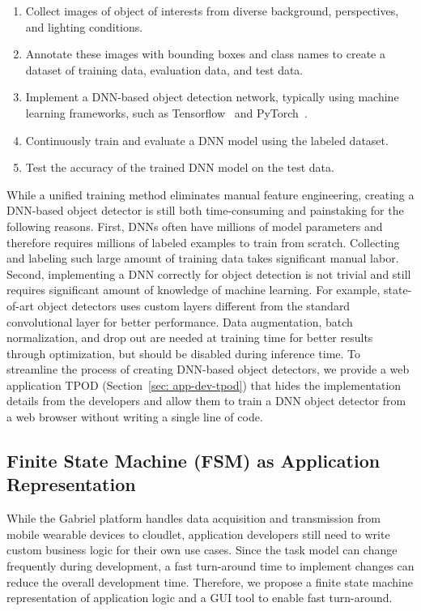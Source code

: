 \begin{enumerate}
  \item Collect images of object of interests from diverse background,
  perspectives, and lighting conditions.
  \item Annotate these images with bounding boxes and class names to create a
  dataset of training data, evaluation data, and test data.
  \item Implement a DNN-based object detection network, typically using machine learning frameworks,
  such as Tensorflow~\cite{abadi2016tensorflow} and
  PyTorch~\cite{paszke2019pytorch}.
  \item Continuously train and evaluate a DNN model using the labeled dataset.
  \item Test the accuracy of the trained DNN model on the test data.
\end{enumerate}

While a unified training method eliminates manual feature engineering, creating
a DNN-based object detector is still both time-consuming and painstaking for the
following reasons. First, DNNs often have millions of model parameters and
therefore requires millions of labeled examples to train from scratch.
Collecting and labeling such large amount of training data takes significant
manual labor. Second, implementing a DNN correctly for object detection is not
trivial and still requires significant amount of knowledge of machine learning.
For example, state-of-art object detectors uses custom layers different from the
standard convolutional layer for better performance. Data augmentation, batch
normalization, and drop out are needed at training time for better results
through optimization, but should be disabled during inference time. To
streamline the process of creating DNN-based object detectors, we provide a web
application TPOD (Section~\ref{sec: app-dev-tpod}) that hides the implementation
details from the developers and allow them to train a DNN object detector from a
web browser without writing a single line of code.

\subsection{Finite State Machine (FSM) as Application Representation}
\label{sec: app-dev-fsm-representation}

While the Gabriel platform handles data acquisition and transmission from mobile
wearable devices to cloudlet, application developers still need to write custom
business logic for their own use cases. Since the task model can change
frequently during development, a fast turn-around time to implement changes can
reduce the overall development time. Therefore, we propose a finite state
machine representation of application logic and a GUI tool to enable fast
turn-around. 

